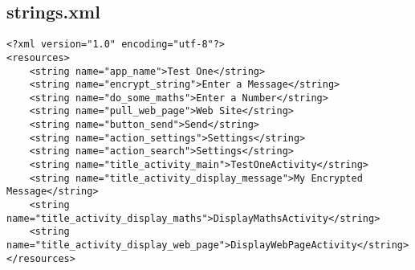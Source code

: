 \subsection{strings.xml}
\label{app:castrings}
\begin{lstlisting}
<?xml version="1.0" encoding="utf-8"?>
<resources>
    <string name="app_name">Test One</string>
    <string name="encrypt_string">Enter a Message</string>
    <string name="do_some_maths">Enter a Number</string>
    <string name="pull_web_page">Web Site</string>
    <string name="button_send">Send</string>
    <string name="action_settings">Settings</string>
    <string name="action_search">Settings</string>
    <string name="title_activity_main">TestOneActivity</string>
    <string name="title_activity_display_message">My Encrypted Message</string>
    <string name="title_activity_display_maths">DisplayMathsActivity</string>
    <string name="title_activity_display_web_page">DisplayWebPageActivity</string>
</resources>
\end{lstlisting}
